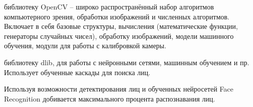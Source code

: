 \begin{itemize*}
\item библиотеку OpenCV -- широко распространённый набор алгоритмов компьютерного зрения, обработки изображений и численных алгоритмов. Включает в себя базовые структуры, вычисления (математические функции, генераторы случайных чисел), обработку изображений, модели машинного обучения, модули для работы с калибровкой камеры.
\item библиотеку dlib, для работы с нейронными сетями, машинным обучением и пр. Использует обученные каскады для поиска лиц.
\end{itemize*}

Используя возможности детектирования лиц и обученных нейросетей Face Recognition добивается максимального процента распознавания лиц.
